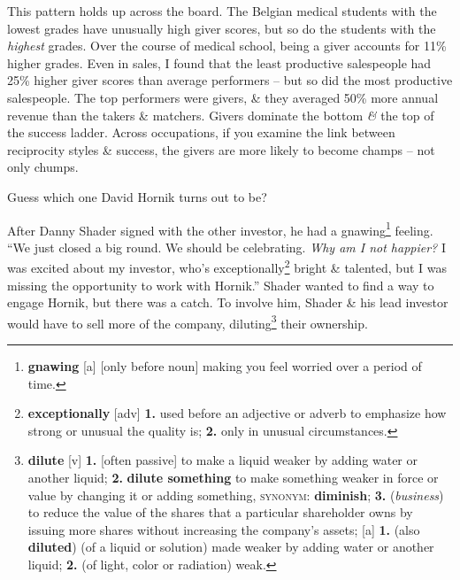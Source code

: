 \documentclass[oneside]{book}
\numberwithin{equation}{section}
\begin{document}
This pattern holds up across the board. The Belgian medical students with the lowest grades have unusually high giver scores, but so do the students with the \textit{highest} grades. Over the course of medical school, being a giver accounts for 11\% higher grades. Even in sales, I found that the least productive salespeople had 25\% higher giver scores than average performers -- but so did the most productive salespeople. The top performers were givers, \& they averaged 50\% more annual revenue than the takers \& matchers. Givers dominate the bottom \textit{\&} the top of the success ladder. Across occupations, if you examine the link between reciprocity styles \& success, the givers are more likely to become champs -- not only chumps.

Guess which one David Hornik turns out to be?

After Danny Shader signed with the other investor, he had a gnawing\footnote{\textbf{gnawing} [a] [only before noun] making you feel worried over a period of time.} feeling. ``We just closed a big round. We should be celebrating. \textit{Why am I not happier?} I was excited about my investor, who's exceptionally\footnote{\textbf{exceptionally} [adv] \textbf{1.} used before an adjective or adverb to emphasize how strong or unusual the quality is; \textbf{2.} only in unusual circumstances.} bright \& talented, but I was missing the opportunity to work with Hornik.'' Shader wanted to find a way to engage Hornik, but there was a catch. To involve him, Shader \& his lead investor would have to sell more of the company, diluting\footnote{\textbf{dilute} [v] \textbf{1.} [often passive] to make a liquid weaker by adding water or another liquid; \textbf{2.} \textbf{dilute something} to make something weaker in force or value by changing it or adding something, \textsc{synonym}: \textbf{diminish}; \textbf{3.} (\textit{business}) to reduce the value of the shares that a particular shareholder owns by issuing more shares without increasing the company's assets; [a] \textbf{1.} (also \textbf{diluted}) (of a liquid or solution) made weaker by adding water or another liquid; \textbf{2.} (of light, color or radiation) weak.} their ownership.
\end{document}
